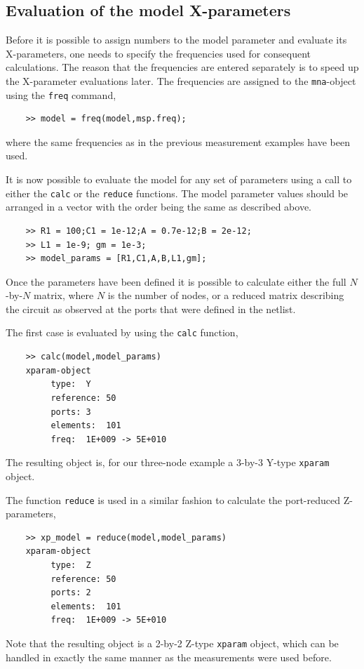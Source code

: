 \subsection{Evaluation of the model X-parameters}
Before it is possible to assign numbers to the model parameter and
evaluate its X-parameters, one needs to specify the frequencies
used for consequent calculations. The reason that the frequencies
are entered separately is to speed up the X-parameter evaluations
later. The frequencies are assigned to the \verb"mna"-object using
the \verb"freq" command,
\begin{small}
\begin{verbatim}
    >> model = freq(model,msp.freq);
\end{verbatim}
\end{small}
where the same frequencies as in the previous measurement examples
have been used.

It is now possible to evaluate the model for any set of parameters
using a call to either the \verb"calc" or the \verb"reduce"
functions. The model parameter values should be arranged in a
vector with the order being the same as described above.
\begin{small}
\begin{verbatim}
    >> R1 = 100;C1 = 1e-12;A = 0.7e-12;B = 2e-12;
    >> L1 = 1e-9; gm = 1e-3;
    >> model_params = [R1,C1,A,B,L1,gm];
\end{verbatim}
\end{small}

Once the parameters have been defined it is possible to calculate
either the full $N$-by-$N$ matrix, where $N$ is the number of
nodes, or a reduced matrix describing the circuit as observed at
the ports that were defined in the netlist.

The first case is evaluated by using the \verb"calc" function,
\begin{small}
\begin{verbatim}
    >> calc(model,model_params)
    xparam-object
    	 type:	Y
    	 reference:	50
    	 ports:	3
    	 elements:	101
    	 freq:	1E+009 -> 5E+010
\end{verbatim}
\end{small}
The resulting object is, for our three-node example a 3-by-3
Y-type \verb"xparam" object.

The function \verb"reduce" is used in a similar fashion to
calculate the port-reduced Z-parameters,
\begin{small}
\begin{verbatim}
    >> xp_model = reduce(model,model_params)
    xparam-object
    	 type:	Z
    	 reference:	50
    	 ports:	2
    	 elements:	101
    	 freq:	1E+009 -> 5E+010
\end{verbatim}
\end{small}
Note that the resulting object is a 2-by-2 Z-type \verb"xparam"
object, which can be handled in exactly the same manner as the
measurements were used before.
